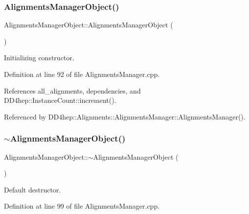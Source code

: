 \subsubsection{\texorpdfstring{Alignments\+Manager\+Object()}{AlignmentsManagerObject()}}
{\footnotesize\ttfamily Alignments\+Manager\+Object\+::\+Alignments\+Manager\+Object (\begin{DoxyParamCaption}{ }\end{DoxyParamCaption})}



Initializing constructor. 



Definition at line 92 of file Alignments\+Manager.\+cpp.



References all\+\_\+alignments, dependencies, and D\+D4hep\+::\+Instance\+Count\+::increment().



Referenced by D\+D4hep\+::\+Alignments\+::\+Alignments\+Manager\+::\+Alignments\+Manager().

\hypertarget{class_d_d4hep_1_1_alignments_1_1_alignments_manager_object_a4eb2f5609448d4e70e2cab1b33311f96}{}\label{class_d_d4hep_1_1_alignments_1_1_alignments_manager_object_a4eb2f5609448d4e70e2cab1b33311f96} 
\subsubsection{\texorpdfstring{$\sim$\+Alignments\+Manager\+Object()}{~AlignmentsManagerObject()}}
{\footnotesize\ttfamily Alignments\+Manager\+Object\+::$\sim$\+Alignments\+Manager\+Object (\begin{DoxyParamCaption}{ }\end{DoxyParamCaption})\hspace{0.3cm}{\ttfamily [virtual]}}



Default destructor. 



Definition at line 99 of file Alignments\+Manager.\+cpp.



